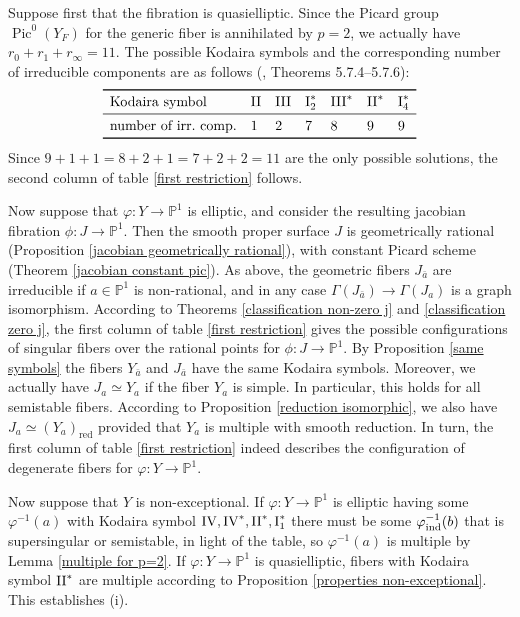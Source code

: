 \documentclass[oneside, 12pt]{amsart}
\theoremstyle{definition}
\theoremstyle{remark}
\newcommand{\PP}{\mathbb{P}}
\newcommand{\I}{\text{\rm I}}
\newcommand{\II}{\text{\rm II}}
\newcommand{\III}{\text{\rm III}}
\newcommand{\IV}{\text{\rm IV}}
\newcommand{\Pic}{\operatorname{Pic}}
\newcommand{\ra}{\rightarrow}
\newcommand{\red}{{\operatorname{red}}}
\newcommand{\ind}{\text{\rm ind}}
\newcommand{\ba}{{\bar{a}}}
\newcommand{\inv}{{-1}}
\begin{document}
Suppose first that the fibration is quasielliptic.  Since the Picard group $\Pic^0(Y_F)$ for the generic fiber  
is annihilated by $p=2$, we actually have  $r_0+r_1+r_\infty=11$. The possible Kodaira symbols
and
the corresponding number of irreducible components  are as follows (\cite{Cossec; Dolgachev 1989}, Theorems 5.7.4--5.7.6):
$$
\begin{array}{lllllll}
\toprule
\text{Kodaira symbol}			& \II	& \III	& \I_2^*	& \III^*	& \II^*	& \I_4^*\\
\midrule
\text{number of irr.\ comp.}	& 1		& 2		& 7			& 8			& 9		& 9\\
\bottomrule
\end{array}
$$
Since $9+1+1=8+2+1=7+2+2=11$ are the only possible solutions, the second column of table \eqref{first restriction} follows.

Now suppose that $\varphi:Y\ra\PP^1$ is elliptic, and consider the resulting jacobian fibration $\phi:J\ra\PP^1$.
Then the smooth proper surface $J$ is geometrically rational (Proposition \ref{jacobian geometrically rational}), 
with constant Picard scheme (Theorem \ref{jacobian constant pic}).
As above, the geometric fibers $J_\ba$ are irreducible if $a\in \PP^1$ is non-rational,
and in any case $\Gamma(J_\ba)\ra\Gamma(J_a)$ is a graph isomorphism.
According to Theorems \ref{classification non-zero j} and \ref{classification zero j}, 
the first column of table \eqref{first restriction} gives the possible configurations
of singular fibers over the  rational points for $\phi:J\ra\PP^1$. 
By Proposition \ref{same symbols} the fibers $Y_\ba$ and $J_\ba$ have the same Kodaira symbols. 
Moreover, we  actually have $J_a\simeq Y_a$ if the fiber $Y_a$ is simple. In particular, this holds for all semistable
fibers. According to Proposition \ref{reduction isomorphic}, we also have $J_a\simeq (Y_a)_\red$ provided that $Y_a$ is multiple 
with smooth reduction. In turn, the first column of table \eqref{first restriction} indeed describes the configuration of
degenerate fibers for $\varphi:Y\ra\PP^1$.

Now suppose that $Y$ is non-exceptional. If $\varphi:Y\ra\PP^1$ is elliptic 
having some $\varphi^{-1}(a)$ with Kodaira symbol $\IV,\IV^*,\II^*,\I_1^*$ there must   be 
some $\varphi^\inv_\ind(b)$ that is supersingular or semistable, in light of  the table,
so $\varphi^{-1}(a)$ is multiple by Lemma \ref{multiple for p=2}.
If $\varphi:Y\ra\PP^1$ is quasielliptic, fibers with Kodaira symbol $\II^*$ are multiple 
according to    Proposition \ref{properties non-exceptional}. This establishes (i).
\end{document}
